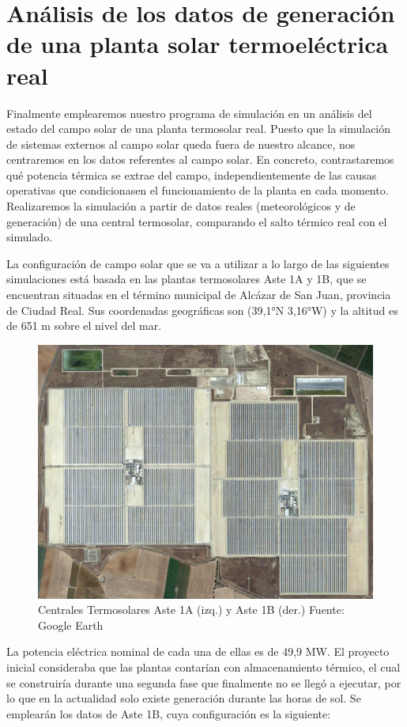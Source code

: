 \section{Análisis de los datos de generación de una planta solar termoeléctrica real}
\label{descripcion-central}

Finalmente emplearemos nuestro programa de simulación en un análisis del estado del campo solar de una planta termosolar real. Puesto que la simulación de sistemas externos al campo solar queda fuera de nuestro alcance, nos centraremos en los datos referentes al campo solar. En concreto, contrastaremos  qué potencia térmica se extrae del campo, independientemente de las causas operativas que condicionasen el funcionamiento de la planta en cada momento. Realizaremos la simulación a partir de datos reales (meteorológicos y de generación) de una central termosolar, comparando el salto térmico real con el simulado. 

La configuración de campo solar que se va a utilizar a lo largo de las siguientes simulaciones está basada en las plantas termosolares Aste 1A y 1B, que se encuentran situadas en el término municipal de Alcázar de San Juan, provincia de Ciudad Real. Sus coordenadas geográficas son (39,1°N 3,16°W) y la altitud es de 651 m sobre el nivel del mar.

\begin{figure}[H]
\includegraphics[width=0.9\linewidth]{images/fotoAstes.png}
\caption[Vista aérea de las centrales Aste 1A y Aste 1B]{Centrales Termosolares Aste 1A (izq.) y Aste 1B (der.) Fuente: Google Earth} 
\label{fig:astes}
\end{figure}

La potencia eléctrica nominal de cada una de ellas es de 49,9 MW. El proyecto inicial consideraba que las plantas contarían con almacenamiento térmico, el cual se construiría durante una segunda fase que finalmente no se llegó a ejecutar, por lo que en la actualidad solo existe generación durante las horas de sol. Se emplearán los datos de Aste 1B, cuya configuración es la siguiente:

